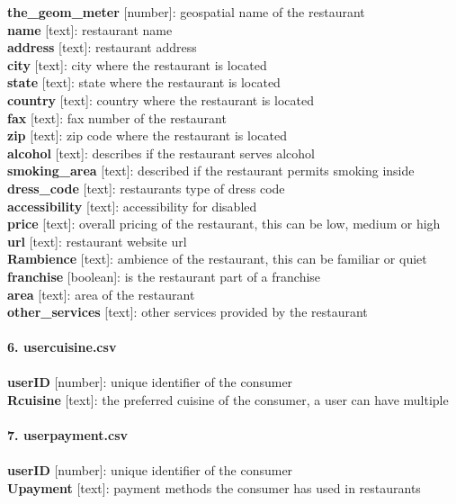 \textbf{the\_geom\_meter} [number]: geospatial name of the restaurant\\
\textbf{name} [text]: restaurant name\\
\textbf{address} [text]: restaurant address\\
\textbf{city} [text]: city where the restaurant is located\\
\textbf{state} [text]: state where the restaurant is located\\
\textbf{country} [text]: country where the restaurant is located\\
\textbf{fax} [text]: fax number of the restaurant\\
\textbf{zip} [text]: zip code where the restaurant is located\\
\textbf{alcohol} [text]: describes if the restaurant serves alcohol\\
\textbf{smoking\_area} [text]: described if the restaurant permits smoking inside\\
\textbf{dress\_code} [text]: restaurants type of dress code\\
\textbf{accessibility} [text]: accessibility for disabled\\
\textbf{price} [text]: overall pricing of the restaurant, this can be low, medium or high\\
\textbf{url} [text]: restaurant website url\\
\textbf{Rambience} [text]: ambience of the restaurant, this can be familiar or quiet\\
\textbf{franchise} [boolean]: is the restaurant part of a franchise\\
\textbf{area} [text]: area of the restaurant\\
\textbf{other\_services} [text]: other services provided by the restaurant\\
\\
\textbf{\large 6. usercuisine.csv}\\
\\
\textbf{userID} [number]: unique identifier of the consumer\\
\textbf{Rcuisine} [text]: the preferred cuisine of the consumer, a user can have multiple\\
\\
\textbf{\large 7. userpayment.csv}\\
\\
\textbf{userID} [number]: unique identifier of the consumer\\
\textbf{Upayment} [text]: payment methods the consumer has used in restaurants\\
\\



